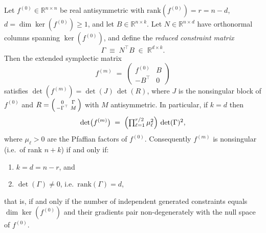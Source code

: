 \documentclass[10pt,a4paper]{amsart}
\begin{document}
\begin{lemma}\label{lem:rank}
	Let $f^{(0)} \in \mathbb{R}^{n \times n}$ be real antisymmetric with $\mathrm{rank}(f^{(0)}) = r = n - d$, $d = \dim\ker(f^{(0)}) \geq 1$, and let $B \in \mathbb{R}^{n \times k}$. Let $N \in \mathbb{R}^{n\times d}$ have orthonormal columns spanning $\ker(f^{(0)})$, and define the \emph{reduced constraint matrix}
	\[
	\Gamma \;\equiv\; N^{\top} B \;\in\; \mathbb{R}^{d\times k}.
	\]
	Then the extended symplectic matrix
	\[
	f^{(m)} \;=\; \begin{pmatrix} f^{(0)} & B \\ - B^{\top} & 0 \end{pmatrix}
	\]
	satisfies $\det(f^{(m)}) = \det(J)\,\det(R)$, where $J$ is the nonsingular block of $f^{(0)}$ and $R=\begin{psmallmatrix} 0 & \Gamma \\ -\Gamma^{\top} & M\end{psmallmatrix}$ with $M$ antisymmetric. In particular, if $k = d$ then
	\begin{equation}\label{eq:rank-lemma}
		\det\bigl(f^{(m)}\bigr) \;=\; \Bigl(\textstyle\prod_{\ell=1}^{r/2}\mu_\ell^{2}\Bigr)\,\det(\Gamma)^2 ,
	\end{equation}
	where $\mu_\ell>0$ are the Pfaffian factors of $f^{(0)}$. Consequently $f^{(m)}$ is nonsingular (i.e.\ of rank $n+k$) if and only if:
	\begin{enumerate}
		\item[\textup{(i)}] $k = d = n - r$, and
		\item[\textup{(ii)}] $\det(\Gamma) \neq 0$, i.e.\ $\mathrm{rank}(\Gamma) = d$,
	\end{enumerate}
	that is, if and only if the number of independent generated constraints equals $\dim\ker(f^{(0)})$ and their gradients pair non-degenerately with the null space of $f^{(0)}$.
\end{lemma}
\end{document}
